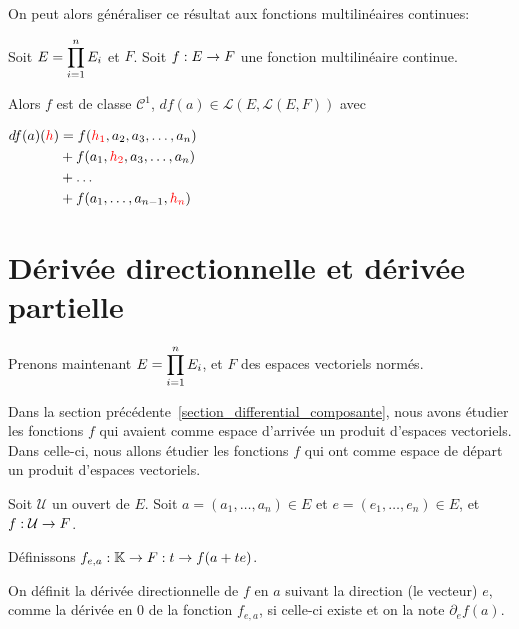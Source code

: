 On peut alors généraliser ce résultat aux fonctions multilinéaires continues:

\begin{proposition}
\label{multilinear_differential_application}
	Soit $E = \displaystyle \prod_{i = 1}^{n} E_{i}$ et $F$.
	Soit $f : E \rightarrow F$ une fonction multilinéaire continue.

	Alors $f$ est de classe $\mathcal{C}^{1}$,
	$df(a) \in \mathcal{L}(E, \mathcal{L}(E, F))$ avec

	$
	\begin{aligned}
		df(a)(\textcolor{red}{h})
	&=	f(\textcolor{red}{h_{1}}, a_{2}, a_{3}, \ldots, a_{n}) \\
	&+	f(a_{1}, \textcolor{red}{h_{2}}, a_{3}, \ldots, a_{n}) \\
	&+	\ldots \\
	&+	f(a_{1}, \ldots, a_{n-1}, \textcolor{red}{h_{n}})
	\end{aligned}
	$
\end{proposition}
\section{Dérivée directionnelle et dérivée partielle}
\label{section_directionnal_partial_derivative}

Prenons maintenant $E = \displaystyle \prod_{i = 1}^{n} E_{i}$, et $F$ des espaces vectoriels
normés.

Dans la section précédente~\ref{section_differential_composante}, nous avons
étudier les fonctions $f$ qui avaient comme espace d'arrivée un produit d'espaces
vectoriels. Dans celle-ci, nous allons étudier les fonctions $f$ qui ont comme
espace de départ un produit d'espaces vectoriels.


\begin{definition}
\label{directionnal_application_definition}
	Soit $\mathcal{U}$ un ouvert de $E$.
	Soit $a = (a_{1}, \ldots, a_{n}) \in E$ et $e = (e_{1}, \ldots, e_{n}) \in E$,
	et $f : \mathcal{U} \rightarrow F$.

	Définissons $f_{e, a} : \mathbb{K} \rightarrow F: t \rightarrow f(a + te)$.

	On définit la dérivée directionnelle de $f$ en $a$ suivant la direction (le
	vecteur) $e$, comme la dérivée en $0$ de la fonction $f_{e, a}$, si celle-ci
	existe et on la note ${\partial_{e} f}(a)$.

\end{definition}

